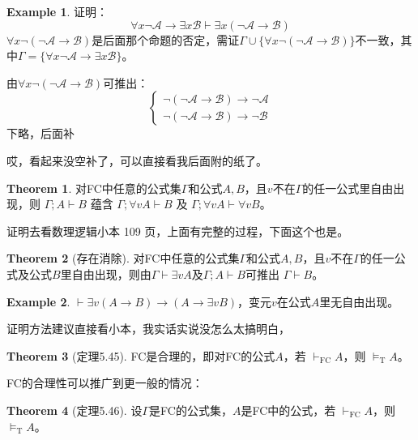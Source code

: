 \documentclass[oneside]{book}
\theoremstyle{definition}
\newtheorem{example}{Example}[section]
\newtheorem{theorem}{Theorem}[section]
\begin{document}
\begin{example}
	证明：
	\[
	\forall x \neg \mathcal{A} \to \exists x \mathcal{B} \vdash \exists x (\neg \mathcal{A} \to \mathcal{B})
	\]
	\( \forall x \neg (\neg \mathcal{A} \to \mathcal{B}) \)是后面那个命题的否定，需证\( \Gamma \cup \{ \forall x \neg (\neg \mathcal{A} \to \mathcal{B}) \} \)不一致，其中\( \Gamma = \{ \forall x \neg \mathcal{A} \to \exists x \mathcal{B} \} \)。
	
	由\( \forall x \neg (\neg \mathcal{A} \to \mathcal{B}) \)可推出：
	\[
	\begin{cases}
		\neg (\neg \mathcal{A} \to \mathcal{B}) \to \neg \mathcal{A} \\
		\neg (\neg \mathcal{A} \to \mathcal{B}) \to \neg \mathcal{B}
	\end{cases}
	\]
	下略，后面补
\end{example}
哎，看起来没空补了，可以直接看我后面附的纸了。

\begin{theorem}
	对FC中任意的公式集\(\Gamma\)和公式\(A,B\)，且\(v\)不在\(\Gamma\)的任一公式里自由出现，则  
	\(\Gamma; A \vdash B\) 蕴含 \(\Gamma; \forall v A \vdash B\) 及 \(\Gamma; \forall v A \vdash \forall v B\)。  
\end{theorem}
证明去看数理逻辑小本 109 页，上面有完整的过程，下面这个也是。
\begin{theorem}[存在消除]
	对FC中任意的公式集\(\Gamma\)和公式\(A,B\)，且\(v\)不在\(\Gamma\)的任一公式及公式\(B\)里自由出现，则由\(\Gamma \vdash \exists v A\)及\(\Gamma; A \vdash B\)可推出 \(\Gamma \vdash B\)。  
\end{theorem}

\begin{example}
	\(\vdash \exists v (A \to B) \to (A \to \exists v B)\)，变元\(v\)在公式\(A\)里无自由出现。  
\end{example}

证明方法建议直接看小本，我实话实说没怎么太搞明白，

\begin{theorem}[定理5.45]  
	FC是合理的，即对FC的公式\( A \)，若 \( \vdash_{\text{FC}} A \)，则 \( \models_{\text{T}} A \)。  
\end{theorem}  

FC的合理性可以推广到更一般的情况：  

\begin{theorem}[定理5.46]  
	设\( \Gamma \)是FC的公式集，\( A \)是FC中的公式，若 \( \vdash_{\text{FC}} A \)，则 \( \models_{\text{T}} A \)。  
\end{theorem}  
\end{document}
